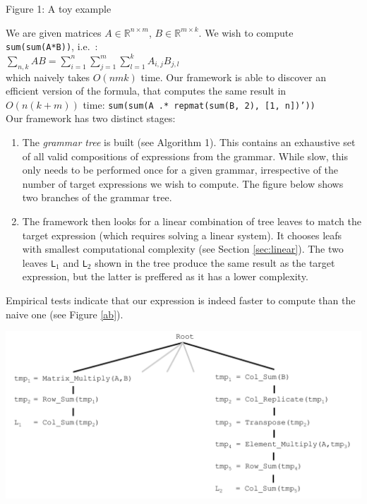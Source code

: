 \begin{minipage}{\linewidth}
\begin{framed}
\begin{flushleft}
Figure 1: A toy example
\vspace{3mm}

We are given matrices $A \in \mathbb{R}^{n \times m}$, $B \in \mathbb{R}^{m \times k}$. We wish
 to compute \texttt{sum(sum(A*B))}, i.e.~: 
\vspace{1.5mm} \\ 
$\sum_{n,k} AB = \sum_{i = 1}^n \sum_{j = 1}^m \sum_{l = 1}^k A_{i, j} B_{j, l} $
\vspace{1.5mm} \\ 
which naively takes $O(nmk)$ time. Our framework is able to discover
an efficient version of the formula, that computes the same result in $O(n(k+m))$
time: \texttt{sum(sum(A .* repmat(sum(B, 2), [1, n])'))}
 \vspace{1mm} \\ 
Our framework has two  distinct stages:
 \vspace{-2mm} 
 \begin{enumerate}
\item The {\em grammar tree} is built (see Algorithm 1). This contains
  an exhaustive set of all valid compositions of expressions from the
  grammar. While slow, this only needs to be performed once for a
  given grammar, irrespective of the number of target expressions we
  wish to compute. The figure below shows two branches of the grammar
  tree.
\item The framework then looks for a linear combination of tree leaves 
  to match the target expression (which requires solving a linear system).
  It chooses leafs with smallest computational complexity 
  (see Section \ref{sec:linear}). The two leaves \texttt{L$_1$} and
  \texttt{L$_2$} shown in the tree produce the same result as the target
  expression, but the latter is preffered as it has a lower complexity. 
\end{enumerate}

Empirical tests indicate that our expression is indeed faster to
compute than the naive one (see Figure \ref{ab}).

\includegraphics[scale=0.4]{img/toy_tree.pdf}
\vspace{-5mm}
\end{flushleft}
\end{framed}
\label{fig:example_ab}

\end{minipage}


